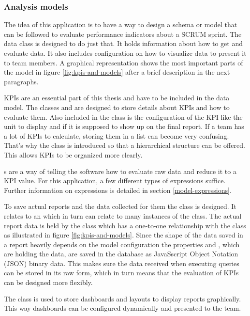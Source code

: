 \subsubsection*{Analysis models}

The idea of this application is to have a way to design a schema or model that can be followed to evaluate performance indicators about a SCRUM sprint. 
The  data class is designed to do just that. 
It holds information about how to get and evaluate data. 
It also includes configuration on how to visualize data to present it to team members. 
A graphical representation shows the most important parts of the model in figure \ref{fig:kpis-and-models} after a brief description in the next paragraphs.

KPIs are an essential part of this thesis and have to be included in the data model. 
The classes  and  are designed to store details about KPIs and how to evaluate them. 
Also included in the  class is the configuration of the KPI like the unit to display and if it is supposed to show up on the final report. 
If a team has a lot of KPIs to calculate, storing them in a list can become very confusing. 
That's why the class  is introduced so that a hierarchical structure can be offered. 
This allows KPIs to be organized more clearly.

s are a way of telling the software how to evaluate raw data and reduce it to a KPI value. 
For this application, a few different types of expressions suffice. 
Further information on expressions is detailed in section \ref{model-expressions}.

To save actual reports and the data collected for them the  class is designed. 
It relates to an  which in turn can relate to many instances of the  class. 
The actual report data is held by the class  which has a one-to-one relationship with the  class as illustrated in figure \ref{fig:kpis-and-models}. 
Since the shape of the data saved in a report heavily depends on the model configuration the properties  and , 
which are holding the data, are saved in the database as JavaSscript Object Notation (JSON) binary data. 
This makes sure the data received when executing queries can be stored in its raw form, which in turn means that the evaluation of KPIs can be designed more flexibly. 

The class  is used to store dashboards and layouts to display reports graphically. 
This way dashboards can be configured dynamically and presented to the team.

